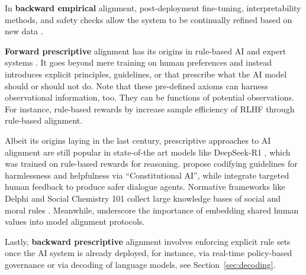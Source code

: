 \documentclass{article}
\theoremstyle{plain}
\theoremstyle{definition}
\theoremstyle{remark}
\begin{document}
In \textbf{backward empirical} alignment, post-deployment fine-tuning, interpretability methods, and safety checks allow the system to be continually refined based on new data \cite{sun2019fine_tune_bert,kairouz2021federated_learning}.  

\textbf{Forward prescriptive} alignment has its origins in rule-based AI and expert systems \cite{giarratano1998expert}. It goes beyond mere training on human preferences and instead introduces explicit principles, guidelines, or  that prescribe what the AI model should or should not do. Note that these pre-defined axioms can harness observational information, too. They can be functions of potential observations. For instance, rule-based rewards by \citet{mu2024rule} increase sample efficiency of RLHF through rule-based alignment. %

Albeit its origins laying in the last century, prescriptive approaches to AI alignment are still popular in state-of-the art models like DeepSeek-R1 \cite{guo2025deepseek}, which was trained on rule-based rewards for reasoning. %
\citet{bai2022constitutional,bai2022training} propose codifying guidelines for harmlessness and helpfulness via “Constitutional AI”, while \citet{glaese2022improving} integrate targeted human feedback to produce safer dialogue agents. Normative frameworks like Delphi and Social Chemistry 101 collect large knowledge bases of social and moral rules \cite{delphi2021,forbes2020social}. Meanwhile, \citet{hendrycks2020aligning} underscore the importance of embedding shared human values into model alignment protocols.

Lastly, \textbf{backward prescriptive} alignment involves enforcing explicit rule sets 
once the AI system is already deployed, for instance, via
real-time policy-based governance \cite{ge2024trust_ai,bayne2005policy_command,wang2021explainable_ai, miao2021ai_education} or via decoding of language models, see Section~\ref{sec:decoding}.

 
\end{document}
